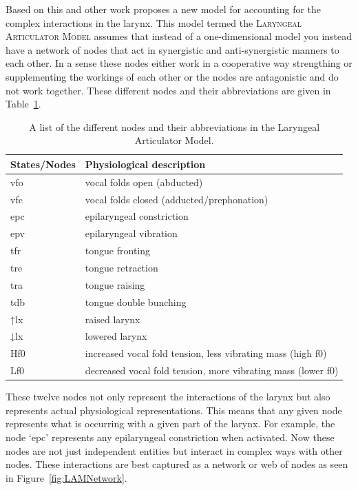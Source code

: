 \documentclass[12pt, letterpaper]{article}
\providecommand{\lsptoprule}{\midrule\toprule}
\providecommand{\lspbottomrule}{\bottomrule\midrule}
\begin{document}
Based on this and other work \citet{eslingVoiceQualityLaryngeal2019} proposes a new model for accounting for the complex interactions in the larynx. This model termed the \textsc{Laryngeal Articulator Model} assumes that instead of a one-dimensional model you instead have a network of nodes that act in synergistic and anti-synergistic manners to each other. In a sense these nodes either work in a cooperative way strengthing or supplementing the workings of each other or the nodes are antagonistic and do not work together. These different nodes and their abbreviations are given in Table~\ref{tab:States}.
\begin{table}[!ht]
	\centering
	\caption{A list of the different nodes and their abbreviations in the Laryngeal Articulator Model.}
	\label{tab:States}
	 \begin{tabular}{ll}
	  \lsptoprule
	  States/Nodes	&	 Physiological description \\
	  \hline
	  	vfo   	&  vocal folds open (abducted) \\
		vfc    	&  vocal folds closed (adducted/prephonation)\\
		epc   	&  epilaryngeal constriction\\
		epv			&  epilaryngeal vibration \\
		tfr 		&  tongue fronting \\
		tre 		&  tongue retraction \\
		tra 		&  tongue raising \\
		tdb 		&	 tongue double bunching\\
		↑lx     &  raised larynx\\
		↓lx			&  lowered larynx\\
		Hf0			&  increased vocal fold tension, less vibrating mass (high f0)\\
		Lf0			&  decreased vocal fold tension, more vibrating mass (lower f0)\\
	  \lspbottomrule
	 \end{tabular}
\end{table}

These twelve nodes not only represent the interactions of the larynx but also represents actual physiological representations. This means that any given node represents what is occurring with a given part of the larynx. For example, the node `epc'  represents any epilaryngeal constriction when activated. Now these nodes are not just independent entities but interact in complex ways with other nodes. These interactions are best captured as a network or web of nodes as seen in Figure~\ref{fig:LAMNetwork}. 
\end{document}
